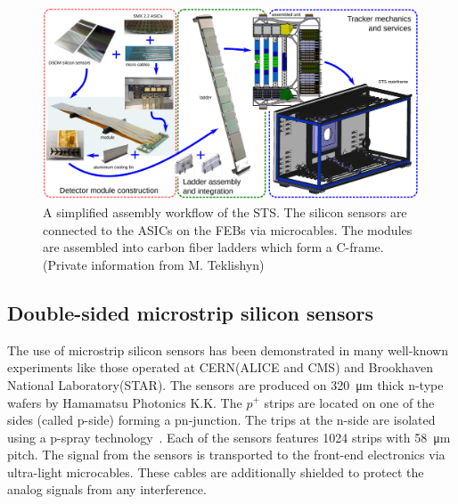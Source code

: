 \newpage
\begin{figure}[!h]
\centering
\includegraphics[width=1\columnwidth]{Chapter2/images/assembly_sequence.png}
\caption{A simplified assembly workflow of the \gls{STS}. The silicon sensors are connected to the ASICs on the \glspl{FEB} via microcables. The modules are assembled into carbon fiber ladders which form a C-frame. (Private information from M. Teklishyn)}
\label{fig_assembly}
\end{figure}






\subsection{Double-sided microstrip silicon sensors}
\label{sensors}

The use of microstrip silicon sensors has been demonstrated in many well-known experiments like those operated at \gls{CERN}(\gls{ALICE} and \gls{CMS}) and Brookhaven National Laboratory(\gls{STAR}). The sensors are produced on \SI{320}{\micro\metre} thick n-type wafers by Hamamatsu Photonics K.K. The $p^{+}$ strips are located on one of the sides (called p-side) forming a pn-junction. The trips at the n-side are isolated using a p-spray technology~\cite{Heuser:54798}. Each of the sensors features 1024 strips with \SI{58}{\micro\metre} pitch. The signal from the sensors is transported to the front-end electronics via ultra-light microcables. These cables are additionally shielded to protect the analog signals from any interference. 

